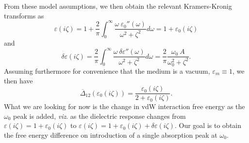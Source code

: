 \documentclass[letterpaper,twocolumn,amsmath,amssymb,floatfix,aps,superscriptaddress]{revtex4}
\begin{document}
From these model assumptions, we then obtain the relevant Kramers-Kronig transforms as 
\begin{equation}
\label{nslrvgnv}
\varepsilon(i \zeta) = 1 + \frac{2}{\pi} \int_0^{\infty} \frac{\omega ~{\varepsilon_0'' (\omega)}}{\omega^2 + \zeta^2}d\omega = 1 + \varepsilon_0 (i \zeta) 
\end{equation}
and
\begin{equation} 
\delta \varepsilon(i \zeta) = \frac{2}{\pi} \int_0^{\infty} \frac{\omega ~{\delta\varepsilon'' (\omega)}}{\omega^2 + \zeta^2}d\omega = \frac{2}{\pi} \frac{\omega_0 ~{A} }{\omega_0^2 + \zeta^2}.
\label{ngkslh}
\end{equation}
Assuming furthermore for convenience that the medium is a vacuum, $\varepsilon_m \equiv 1$, we then have
\begin{equation}
 \overline\Delta_{12}(\varepsilon_0(i \zeta)) = \frac{ \varepsilon_0 (i \zeta)}{2 + \varepsilon_0 (i \zeta)}.
 \end{equation}
What we are looking for now is the change in vdW interaction free energy as the $\omega_0$ peak is added, {\sl viz}. as the dielectric response changes from $ \varepsilon(i \zeta) = 1 + \varepsilon_0 (i \zeta)$ to $\varepsilon(i \zeta) = 1 + \varepsilon_0 (i \zeta) + \delta \varepsilon(i \zeta)$. Our goal is to obtain the free energy difference on introduction of a single absorption peak at $\omega_0$.
\end{document}
